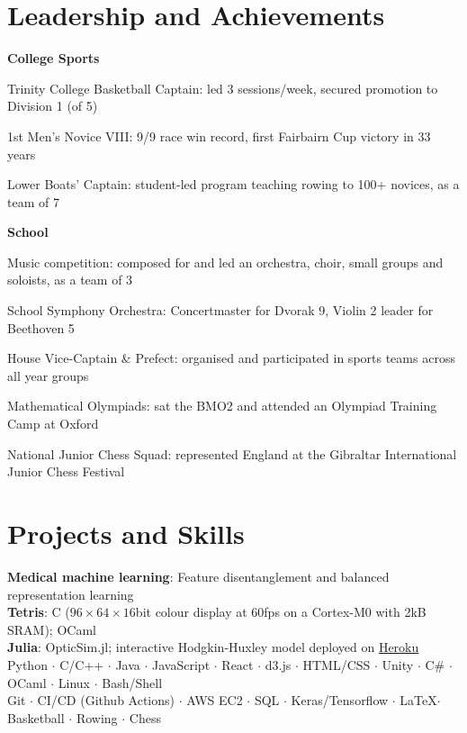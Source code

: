 \documentclass[letterpaper, 10pt]{article}
\begin{document}
\section*{Leadership and Achievements}
\textbf{College Sports}
\begin{compact}
	\item Trinity College Basketball Captain: led 3 sessions/week, secured promotion to Division 1 (of 5)
	\item 1st Men's Novice VIII: 9/9 race win record, first Fairbairn Cup victory in 33 years
	\item Lower Boats' Captain: student-led program teaching rowing to 100+ novices, as a team of 7
\end{compact}
\vspace{.5\baselineskip}
\textbf{School}
\begin{compact}
	\item Music competition: composed for and led an orchestra, choir, small groups and soloists, as a team of 3
	\item School Symphony Orchestra: Concertmaster for Dvorak 9, Violin 2 leader for Beethoven 5
	\item House Vice-Captain \& Prefect: organised and participated in sports teams across all year groups
	\item Mathematical Olympiads: sat the BMO2 and attended an Olympiad Training Camp at Oxford
	\item National Junior Chess Squad: represented England at the Gibraltar International Junior Chess Festival
\end{compact}

\section*{Projects and Skills}
\textbf{Medical machine learning}: Feature disentanglement and balanced representation learning \hfill \href{https://github.com/alfredclwong/ite-feature-selection}{\faGithub}\\
\textbf{Tetris}: C ($96\times64\times16$bit colour display at 60fps on a Cortex-M0 with 2kB SRAM); OCaml \hfill \href{https://github.com/alfredclwong/4b25-tetris}{\faGithub} \href{https://github.com/alfredclwong/tetris-ocaml}{\faGithub}\\
\textbf{Julia}: OpticSim.jl; interactive Hodgkin-Huxley model deployed on \href{http://pluto-demo.herokuapp.com/}{Heroku} \hfill \href{https://github.com/microsoft/OpticSim.jl}{\faGithub} \href{https://github.com/alfredclwong/pluto-demo}{\faGithub}\\

Python $\cdot$ C/C++ $\cdot$ Java $\cdot$ JavaScript $\cdot$ React $\cdot$ d3.js $\cdot$ HTML/CSS $\cdot$ Unity $\cdot$ C\# $\cdot$ OCaml $\cdot$ Linux $\cdot$ Bash/Shell\\
Git $\cdot$ CI/CD (Github Actions) $\cdot$ AWS EC2 $\cdot$ SQL $\cdot$ Keras/Tensorflow $\cdot$ \LaTeX $\cdot$ Basketball $\cdot$ Rowing $\cdot$ Chess
\end{document}
